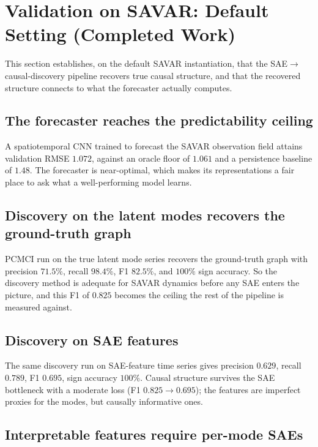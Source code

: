 \section{Validation on SAVAR: Default Setting (Completed Work)}
\label{sec:savar}

This section establishes, on the default SAVAR instantiation, that the
SAE$\rightarrow$causal-discovery pipeline recovers true causal structure, and that
the recovered structure connects to what the forecaster actually computes.


\subsection{The forecaster reaches the predictability ceiling}

A spatiotemporal CNN trained to forecast the SAVAR observation field attains
validation RMSE $1.072$, against an oracle floor of $1.061$ and a persistence
baseline of $1.48$. The forecaster is near-optimal, which makes its representations
a fair place to ask what a well-performing model learns.

\subsection{Discovery on the latent modes recovers the ground-truth graph}

PCMCI run on the true latent mode series recovers the ground-truth graph with
precision $71.5\%$, recall $98.4\%$, F1 $82.5\%$, and $100\%$ sign accuracy. So the
discovery method is adequate for SAVAR dynamics before any SAE enters the picture,
and this F1 of $0.825$ becomes the ceiling the rest of the pipeline is measured
against.

\subsection{Discovery on SAE features}

The same discovery run on SAE-feature time series gives precision $0.629$, recall
$0.789$, F1 $0.695$, sign accuracy $100\%$. Causal structure survives the SAE
bottleneck with a moderate loss (F1 $0.825 \to 0.695$); the features are imperfect
proxies for the modes, but causally informative ones.

\subsection{Interpretable features require per-mode SAEs}


